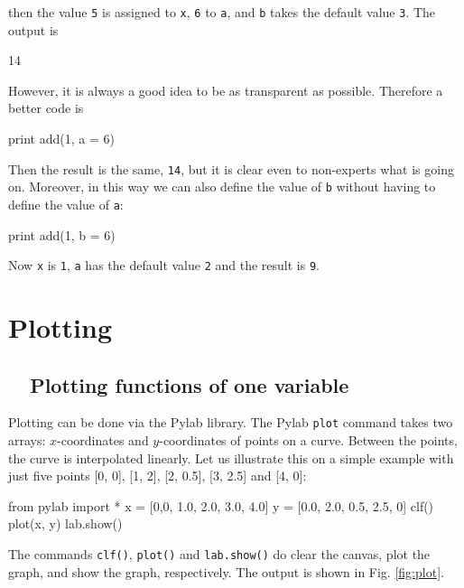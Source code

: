 \begin{itemize}
then the value {\tt 5} is assigned to {\tt x}, {\tt 6} to {\tt a}, and {\tt b} takes the default value {\tt 3}.
The output is
\begin{greencode}
14
\end{greencode}
However, it is always a good idea to be as transparent as possible. Therefore a better code is 
\begin{bluecode}
print add(1, a = 6)
\end{bluecode}
Then the result is the same, {\tt 14}, but it is clear even to non-experts what is going on. Moreover,
in this way we can also define the value of {\tt b} without having to define the value of {\tt a}:
\begin{bluecode}
print add(1, b = 6)
\end{bluecode}
Now {\tt x} is {\tt 1}, {\tt a} has the default value {\tt 2} and the result is {\tt 9}.
\end{itemize}


\section{Plotting} \label{sec:plotting}

\subsection{\ \ Plotting functions of one variable}\label{plotting}

Plotting can be done via the Pylab library. The Pylab {\tt plot} command takes two
arrays: $x$-coordinates and $y$-coordinates of points on a curve. Between the 
points, the curve is interpolated linearly. Let us illustrate this on a simple 
example with just five points [0, 0], [1, 2], [2, 0.5], [3, 2.5] and [4, 0]:

\begin{bluecode}
from pylab import *
x = [0,0, 1.0, 2.0, 3.0, 4.0]
y = [0.0, 2.0, 0.5, 2.5, 0]
clf()
plot(x, y)
lab.show()
\end{bluecode}
The commands {\tt clf()}, {\tt plot()} and {\tt lab.show()} do clear the canvas, 
plot the graph, and show the graph, respectively.
The output is shown in Fig. \ref{fig:plot}.

